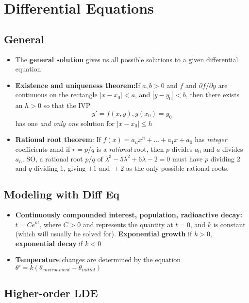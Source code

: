 \documentclass[10pt,letterpaper]{article}
\begin{document}
\section*{Differential Equations}

\subsection*{General}
\begin{itemize}

\item The \textbf{general solution} gives us all possible solutions to a given differential equation

\item \textbf{Existence and uniqueness theorem:}If $a,b>0$ and $f$ and $\partial f/\partial y$ are continuous on the rectangle $|x-x_0|<a$, 
and $|y-y_0|<b$, then there exists an $h>0$ so that the IVP 
$$y'=f(x,y), y(x_0)=y_0$$
has one \textit{and only one} solution for $|x-x_0|\leq h$

\item \textbf{Rational root theorem}: If $f(x)=a_nx^n+...+a_1x+a_0$ has \textit{integer} coefficients zand if $r=p/q$ is a \textit{rational} root, then $p$ divides $a_0$ and $a$ divides $a_n$. SO, a rational root $p/q\mbox{ of }\lambda^3-5\lambda^2+6\lambda-2=0$ must have $p$ dividing 2 and $q$ dividing 1, giving $\pm 1\mbox{ and } \pm 2$ as the only possible rational roots. 

\end{itemize}

\subsection*{Modeling with Diff Eq}

\begin{itemize}
\item \textbf{Continuously compounded interest, population, radioactive decay:} 
$t=Ce^{kt}$, where $C>0$ and represents the quantity at $t=0$, and $k$ is constant (which will usually be solved for). \textbf{Exponential growth} if $k>0$, \textbf{exponential decay} if $k<0$

\item \textbf{Temperature} changes are determined by the equation 
$\theta '= k(\theta_{environment} - \theta_{initial})$

\end{itemize}

\subsection*{Higher-order LDE}
\end{document}
